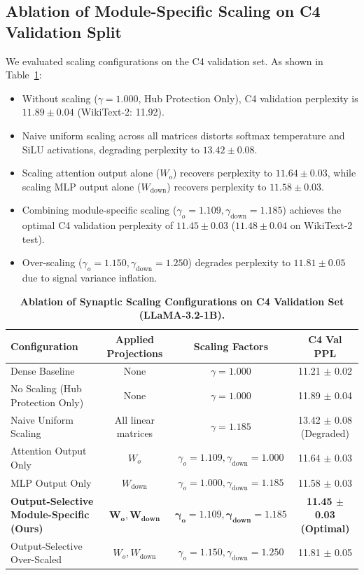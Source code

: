 \documentclass{article}
\begin{document}
\subsection{Ablation of Module-Specific Scaling on C4 Validation Split}
We evaluated scaling configurations on the C4 validation set. As shown in Table~\ref{tab:gamma_ablation}:
\begin{itemize}
    \item Without scaling ($\gamma = 1.000$, Hub Protection Only), C4 validation perplexity is $11.89 \pm 0.04$ (WikiText-2: 11.92).
    \item Naive uniform scaling across all matrices distorts softmax temperature and SiLU activations, degrading perplexity to $13.42 \pm 0.08$.
    \item Scaling attention output alone ($W_o$) recovers perplexity to $11.64 \pm 0.03$, while scaling MLP output alone ($W_{\text{down}}$) recovers perplexity to $11.58 \pm 0.03$.
    \item Combining module-specific scaling ($\gamma_o = 1.109, \gamma_{\text{down}} = 1.185$) achieves the optimal C4 validation perplexity of $\mathbf{11.45 \pm 0.03}$ ($11.48 \pm 0.04$ on WikiText-2 test).
    \item Over-scaling ($\gamma_o = 1.150, \gamma_{\text{down}} = 1.250$) degrades perplexity to $11.81 \pm 0.05$ due to signal variance inflation.
\end{itemize}

\begin{table}[h]
\centering
\small
\caption{\textbf{Ablation of Synaptic Scaling Configurations on C4 Validation Set (LLaMA-3.2-1B).}}
\label{tab:gamma_ablation}
\begin{tabular}{lccc}
\toprule
\textbf{Configuration} & \textbf{Applied Projections} & \textbf{Scaling Factors} & \textbf{C4 Val PPL} \\
\midrule
Dense Baseline & None & $\gamma = 1.000$ & 11.21 $\pm$ 0.02 \\
No Scaling (Hub Protection Only) & None & $\gamma = 1.000$ & 11.89 $\pm$ 0.04 \\
Naive Uniform Scaling & All linear matrices & $\gamma = 1.185$ & 13.42 $\pm$ 0.08 (Degraded) \\
Attention Output Only & $W_o$ & $\gamma_o = 1.109, \gamma_{\text{down}} = 1.000$ & 11.64 $\pm$ 0.03 \\
MLP Output Only & $W_{\text{down}}$ & $\gamma_o = 1.000, \gamma_{\text{down}} = 1.185$ & 11.58 $\pm$ 0.03 \\
\textbf{Output-Selective Module-Specific (Ours)} & $\mathbf{W_o, W_{\text{down}}}$ & $\mathbf{\gamma_o = 1.109, \gamma_{\text{down}} = 1.185}$ & \textbf{11.45 $\pm$ 0.03 (Optimal)} \\
Output-Selective Over-Scaled & $W_o, W_{\text{down}}$ & $\gamma_o = 1.150, \gamma_{\text{down}} = 1.250$ & 11.81 $\pm$ 0.05 \\
\bottomrule
\end{tabular}
\end{table}
\end{document}
